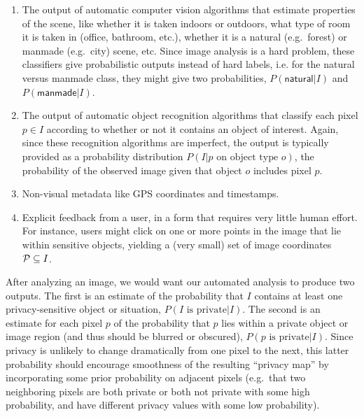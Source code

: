 \documentclass[11pt]{article}
\begin{document}
\begin{appendices}
\begin{enumerate}
\begin{enumerate}
\item The output of automatic computer vision algorithms that estimate
  properties of the scene, like whether it is taken indoors or
  outdoors, what type of room it is taken in (office, bathroom, etc.),
  whether it is a natural (e.g.\ forest) or manmade (e.g.\ city) scene,
  etc. Since image analysis is a hard problem,  these classifiers
  give probabilistic outputs instead of hard labels,
  i.e. for the natural versus manmade class, they might give two
probabilities, $P(\textsf{natural}|I)$ and $P(\textsf{manmade}|I)$.

\item The output of automatic object recognition algorithms that
  classify each pixel $p \in I$ according to whether or not it
  contains an object of interest.  Again, since these recognition
algorithms are imperfect, the output
is typically provided as a probability distribution $P(I |
  p \mbox{ on object type } o)$, the probability of the observed image
given that object $o$ includes pixel $p$.

\item Non-visual metadata like GPS coordinates and timestamps.

\item Explicit feedback from a user, in a form that requires very
  little human effort. For instance, users might click on one or more
  points in the image that lie within sensitive objects, yielding a
  (very small) set of image coordinates ${\cal P} \subseteq I$.
\end{enumerate}

After analyzing an image, we would want our automated analysis to
produce two outputs. The first is an estimate of the probability
that $I$
contains at least one
privacy-sensitive object or situation, $P(I \mbox{ is private} |I)$. The
second is an estimate for each pixel $p$ of the probability that
$p$ lies within a private object or image region (and thus should be
blurred or obscured), $P(p \mbox{ is private} | I)$. Since privacy is
unlikely to change dramatically from one pixel to the  next, this
latter probability should encourage smoothness of the resulting
``privacy map'' by incorporating some prior probability on adjacent
pixels (e.g.\ that two neighboring pixels are both private or both
not private with some high probability, and have different privacy
values with some low probability).


\end{enumerate}
\end{appendices}
\end{document}
